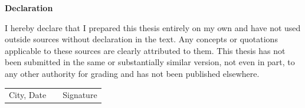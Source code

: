 \documentclass[%
				12pt,
				a4paper,
				twoside,
				titlepage,
				headsepline,
				numbers=noenddot,
				listof=totoc,
				index=totoc,
				bibliography=totoc]{scrartcl}
\theoremstyle{definition}
\begin{document}
	{
		
        {\LARGE \textbf{Declaration}}
        \vspace{20pt}
		
		\noindent I hereby declare that I prepared this thesis entirely on my own and have not used outside sources
		without declaration in the text. Any concepts or quotations applicable to these sources are
		clearly attributed to them. This thesis has not been submitted in the same or substantially similar
		version, not even in part, to any other authority for grading and has not been published elsewhere.\\[27pt]
		
		
		\begin{center}
			\begin{tabular}{l p{} r}
				\cline{1-1} \cline{3-3}
				\begin{minipage}[t]{0.4\textwidth}
					\centering
					City, Date
				\end{minipage}
				&
				\begin{minipage}[t]{0.2\textwidth}
				\end{minipage}
				&
				\begin{minipage}[t]{0.4\textwidth}
					\centering
					Signature
				\end{minipage}
			\end{tabular}
		\end{center}
	}
	\clearpage

  	\tableofcontents
  	\clearpage
  	
	\setcounter{page}{1}
	
  
  	
    \clearpage
    
  	
    \clearpage
    
  	
    \clearpage
    
  	
  	\clearpage
 
  	
  	\clearpage
 
  	
    \clearpage
    
    
    \clearpage
  	\listoffigures
  	\clearpage
  	\listoftables
  	\clearpage
  	
  	
  	
  	
	\clearpage
\end{document}
